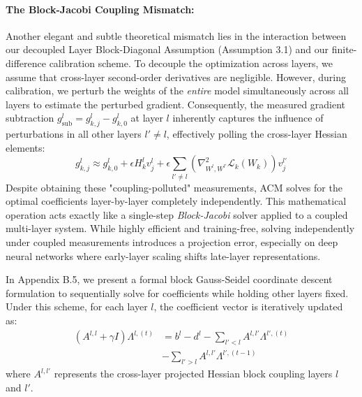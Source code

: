 \paragraph{The Block-Jacobi Coupling Mismatch:}
Another elegant and subtle theoretical mismatch lies in the interaction between our decoupled Layer Block-Diagonal Assumption (Assumption 3.1) and our finite-difference calibration scheme. To decouple the optimization across layers, we assume that cross-layer second-order derivatives are negligible. However, during calibration, we perturb the weights of the \emph{entire} model simultaneously across all layers to estimate the perturbed gradient. Consequently, the measured gradient subtraction $g_{\text{sub}}^l = g_{k,j}^l - g_{k,0}^l$ at layer $l$ inherently captures the influence of perturbations in all other layers $l' \neq l$, effectively polling the cross-layer Hessian elements:
\begin{equation}
    g_{k,j}^l \approx g_{k,0}^l + \epsilon H_k^l v_j^l + \epsilon \sum_{l' \neq l} \left( \nabla^2_{W^l, W^{l'}} \mathcal{L}_k(W_k) \right) v_j^{l'}
\end{equation}
Despite obtaining these "coupling-polluted" measurements, ACM solves for the optimal coefficients layer-by-layer completely independently. This mathematical operation acts exactly like a single-step \emph{Block-Jacobi} solver applied to a coupled multi-layer system. While highly efficient and training-free, solving independently under coupled measurements introduces a projection error, especially on deep neural networks where early-layer scaling shifts late-layer representations. 

In Appendix B.5, we present a formal block Gauss-Seidel coordinate descent formulation to sequentially solve for coefficients while holding other layers fixed. Under this scheme, for each layer $l$, the coefficient vector is iteratively updated as:
\begin{equation}
\begin{split}
    \left( A^{l,l} + \gamma I \right) \Lambda^{l,(t)} &= b^l - d^l - \sum_{l' < l} A^{l, l'} \Lambda^{l',(t)} \\
    &- \sum_{l' > l} A^{l, l'} \Lambda^{l',(t-1)}
\end{split}
\label{eq:main_block_gs}
\end{equation}
where $A^{l, l'}$ represents the cross-layer projected Hessian block coupling layers $l$ and $l'$.

